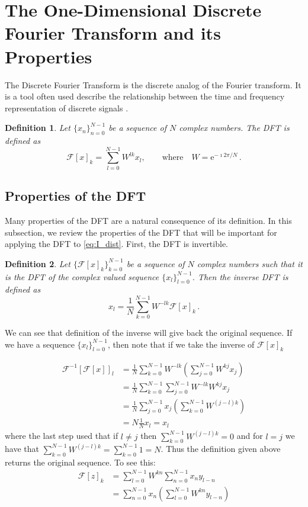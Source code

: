 \documentclass[12pt]{CSUNthesis}
\newtheorem{definition}{Definition}
\def\e{\mathrm{e}}
\def\calF{\mathcal{F}}
\begin{document}
\section{The One-Dimensional Discrete Fourier Transform and its Properties}

The Discrete Fourier Transform is the discrete analog of the Fourier transform. It is a tool often used describe the relationship between the time and frequency representation of discrete signals \cite{Nussbaumer1982}. 
\begin{definition}
Let $\{x_n\}_{n=0}^{N-1}$ be a sequence of $N$ complex numbers. The DFT is defined as
\begin{equation}
\label{eq:dft_1d}
\calF[x]_{k} =  \sum_{l=0}^{N-1} W^{lk} x_l, \qquad  
\mbox{where}\quad 
W=\e^{-\imath 2\pi/N}\, .
\end{equation}
\end{definition}

\subsection{Properties of the DFT}

Many properties of the DFT are a natural consequence of its definition. In this subsection, we review the properties of the DFT that will be important for applying the DFT to \ref{eq:I_dist}. First, the DFT is invertible.

\begin{definition}
Let $\{\calF [x]_k\}_{k=0}^{N-1}$ be a sequence of $N$ complex numbers such that it is the DFT of the complex valued sequence $\{x_l\}_{l=0}^{N-1}$. Then the inverse DFT is defined as
\begin{equation}
\label{eq:idft_1d}
x_{l} = \frac{1}{N} \sum_{k=0}^{N-1} W^{-lk} \calF[x]_{k} \, .
\end{equation}
\end{definition}

We can see that definition of the inverse will give back the original sequence. If we have a sequence $\{x_l\}_{l=0}^{N-1}$, then note that if we take the inverse of $\calF[x]_k$

\begin{align*}
\calF^{-1}[\calF[x]]_l &= \frac{1}{N} \sum_{k=0}^{N-1}W^{-lk}(\sum_{j=0}^{N-1} W^{kj} x_j) \\
 &= \frac{1}{N} \sum_{k=0}^{N-1} \sum_{j=0}^{N-1} W^{-lk} W^{kj} x_j \\
 &= \frac{1}{N} \sum_{j=0}^{N-1}  x_j (\sum_{k=0}^{N-1} W^{(j-l)k}) \\
 &= N \frac{1}{N} x_l = x_l
\end{align*}
where the last step used that if $l \not = j$ then $\sum_{k=0}^{N-1} W^{(j-l)k} = 0$ and for $l=j$ we have that $\sum_{k=0}^{N-1} W^{(j-l)k} = \sum_{k=0}^{N-1} 1 = N$. Thus the definition given above returns the original sequence. To see this:
\begin{align*}
\calF[z]_k &= \sum_{l=0}^{N-1} W^{kn} \sum_{n=0}^{N-1} x_{n}y_{l-n} \\
&= \sum_{n=0}^{N-1} x_{n} ( \sum_{l=0}^{N-1} W^{kn}y_{l-n})
\end{align*}
\end{document}
